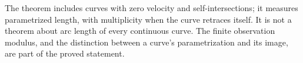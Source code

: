The theorem includes curves with zero velocity and self-intersections;
it measures parametrized length, with multiplicity when the curve retraces
itself. It is not a theorem about arc length of every continuous curve.
The finite observation modulus, and the distinction between a curve's
parametrization and its image, are part of the proved statement.
